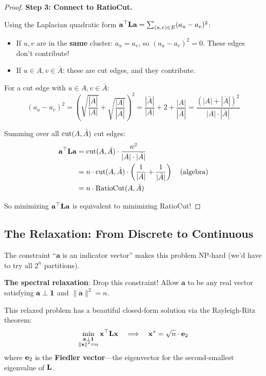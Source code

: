 \begin{notechapter}
\begin{proof}
\textbf{Step 3: Connect to RatioCut.}

Using the Laplacian quadratic form $\mathbf{a}^\top \mathbf{L} \mathbf{a} = \sum_{(u,v) \in E} (a_u - a_v)^2$:
\begin{itemize}
    \item If $u, v$ are in the \textbf{same} cluster: $a_u = a_v$, so $(a_u - a_v)^2 = 0$. These edges don't contribute!
    \item If $u \in A, v \in \bar{A}$: these are cut edges, and they contribute.
\end{itemize}

For a cut edge with $u \in A, v \in \bar{A}$:
\[
(a_u - a_v)^2 = \left( \sqrt{\frac{|\bar{A}|}{|A|}} + \sqrt{\frac{|A|}{|\bar{A}|}} \right)^2 = \frac{|\bar{A}|}{|A|} + 2 + \frac{|A|}{|\bar{A}|} = \frac{(|A| + |\bar{A}|)^2}{|A| \cdot |\bar{A}|}
\]

Summing over all $\mathrm{cut}(A, \bar{A})$ cut edges:
\begin{align}
\mathbf{a}^\top \mathbf{L} \mathbf{a} &= \mathrm{cut}(A, \bar{A}) \cdot \frac{n^2}{|A| \cdot |\bar{A}|} \\
&= n \cdot \mathrm{cut}(A, \bar{A}) \cdot \left( \frac{1}{|A|} + \frac{1}{|\bar{A}|} \right) \quad \text{(algebra)} \\
&= n \cdot \text{RatioCut}(A, \bar{A})
\end{align}

So minimizing $\mathbf{a}^\top \mathbf{L} \mathbf{a}$ is equivalent to minimizing RatioCut!
\end{proof}

\subsection{The Relaxation: From Discrete to Continuous}

\begin{keyidea}
The constraint ``$\mathbf{a}$ is an indicator vector'' makes this problem NP-hard (we'd have to try all $2^n$ partitions).

\textbf{The spectral relaxation}: Drop this constraint! Allow $\mathbf{a}$ to be any real vector satisfying $\mathbf{a} \perp \mathbf{1}$ and $\|\mathbf{a}\|^2 = n$.

This relaxed problem has a beautiful closed-form solution via the Rayleigh-Ritz theorem:
\[
\min_{\substack{\mathbf{x} \perp \mathbf{1} \\ \|\mathbf{x}\|^2 = n}} \mathbf{x}^\top \mathbf{L} \mathbf{x} \quad \Longrightarrow \quad \mathbf{x}^* = \sqrt{n} \cdot \mathbf{e}_2
\]
where $\mathbf{e}_2$ is the \textbf{Fiedler vector}---the eigenvector for the second-smallest eigenvalue of $\mathbf{L}$.
\end{keyidea}


\end{notechapter}
